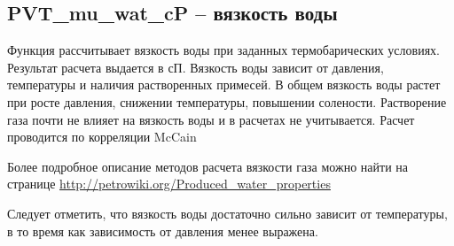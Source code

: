 \newcommand{\MugDataFile}{data/Mug_P_data.txt}

\subsection{PVT\_mu\_wat\_cP – вязкость воды}

Функция рассчитывает вязкость воды при заданных термобарических условиях. Результат расчета выдается в сП. 
Вязкость воды зависит от давления, температуры и наличия растворенных примесей. В общем вязкость воды растет при росте давления, снижении температуры, повышении солености. 
Растворение газа почти не влияет на вязкость воды и в расчетах не учитывается. 
Расчет проводится по корреляции McCain \cite{McCain_1991}

Более подробное описание методов расчета вязкости газа можно найти на странице  \href{http://petrowiki.org/Produced_water_properties}{http://petrowiki.org/Produced\_water\_properties}




Следует отметить, что вязкость воды достаточно сильно зависит от температуры, в то время как зависимость от давления менее выражена.

